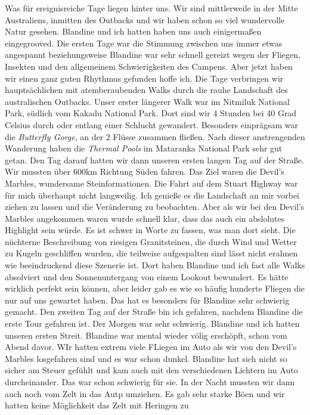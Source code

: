 \documentclass[11pt]{book}
\begin{document}
Was für ereignisreiche Tage liegen hinter uns. Wir sind mittlerweile in der Mitte Australiens, inmitten des Outbacks und wir 
haben schon so viel wundervolle Natur gesehen. Blandine und ich hatten haben uns auch einigermaßen eingegrooved. Die ersten 
Tage war die Stimmung zwischen uns immer etwas angespannt beziehungsweise Blandine war sehr schnell gereizt wegen der Fliegen, 
Insekten und den allgemeinem Schwierigkeiten des Campens. Aber jetzt haben wir einen ganz guten Rhythmus gefunden hoffe ich.
Die Tage verbringen wir hauptsächlichen mit atemberaubenden Walks durch die rauhe Landschaft des australischen Outbacks. Unser 
erster längerer Walk war im Nitmiluk National Park, südlich vom Kakadu National Park. Dort sind wir 4 Stunden bei 40 Grad Celsius 
durch oder entlang einer Schlucht gewandert. Besonders einprägsam war die \emph{Butterfly Gorge}, an der 2 Flüsse zusammen fließen. 
Nach dieser anstrengenden Wanderung haben die \emph{Thermal Pools} im Mataranka National Park sehr gut getan. Den Tag darauf 
hatten wir dann unseren ersten langen Tag auf der Straße. Wir mussten über 600km Richtung Süden fahren. Das Ziel waren die Devil's 
Marbles, wundersame Steinformationen. Die Fahrt auf dem Stuart Highway war für mich überhaupt nicht langweilig. Ich genieße es 
die Landschaft an mir vorbei ziehen zu lassen und die Veränderung zu beobachten. Aber als wir bei den Devil's Marbles angekommen 
waren wurde schnell klar, dass das auch ein abslolutes Highlight sein würde. Es ist schwer in Worte zu fassen, was man dort sieht.
Die nüchterne Beschreibung von riesigen Granitsteinen, die durch Wind und Wetter zu Kugeln geschliffen wurden, die teilweise 
aufgespalten sind lässt nicht erahnen wie beeindruckend diese Szenerie ist. Dort haben Blandine und ich fast alle Walks absolviert 
und den Sonnenuntergang von einem Lookout bewundert. Es hätte wirklich perfekt sein können, aber leider gab es wie so häufig 
hunderte Fliegen die nur auf uns gewartet haben. Das hat es besonders für Blandine sehr schwierig gemacht. Den zweiten Tag auf 
der Straße bin ich gefahren, nachdem Blandine die erste Tour gefahren ist. Der Morgen war sehr schwierig. Blandine und ich hatten 
unseren ersten Streit. Blandine war mental wieder völig erschöpft, schon vom Abend davor. WIr hatten extrem viele FLiegen im 
Auto als wir von den Devil's Marbles losgefahren sind und es war schon dunkel. Blandine hat sich nicht so sicher am Steuer gefühlt 
und kam auch mit den verschiedenen Lichtern im Auto durcheinander. Das war schon schwierig für sie. In der Nacht mussten wir 
dann auch noch vom Zelt in das Autp umziehen. Es gab sehr starke Böen und wir hatten keine Möglichkeit das Zelt mit Heringen zu 
\end{document}
